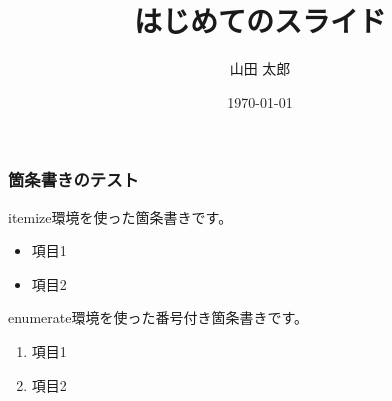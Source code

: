 \documentclass{beamer}
\title{はじめてのスライド}
\author{山田 太郎}
\institute{羅手府大学}
\date{\today}
\begin{document}
\maketitle
\begin{frame}
  \frametitle{箇条書きのテスト}
  itemize環境を使った箇条書きです。
  \begin{itemize}
    \item
    項目1
    \item
    項目2
  \end{itemize}

  enumerate環境を使った番号付き箇条書きです。
  \begin{enumerate}
    \item
    項目1
    \item
    項目2
  \end{enumerate}
\end{frame}
\end{document}
